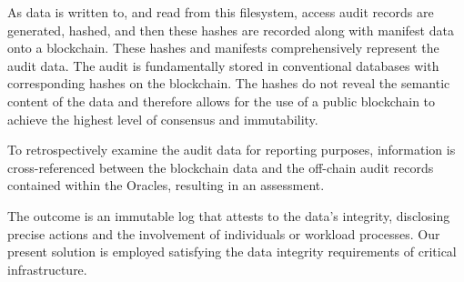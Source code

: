 \documentclass{tufte-handout}
\begin{document}
As data is written to, and read from this filesystem, access audit records are generated, hashed, and then these hashes are recorded along with manifest data onto a blockchain. These
hashes and manifests comprehensively represent the audit data. The audit is fundamentally stored in conventional databases with corresponding hashes on the blockchain. The hashes do not reveal
the semantic content of the data and therefore allows for the use of a public blockchain to achieve the highest level of consensus and immutability.

To retrospectively examine the audit data for reporting purposes, information is cross-referenced between the blockchain data and the off-chain audit records contained within the Oracles, resulting
in an assessment.

The outcome is an immutable log that attests to the data's integrity, disclosing precise actions and the involvement of individuals or workload processes. Our present solution is employed satisfying
the data integrity requirements of critical infrastructure.
\end{document}
